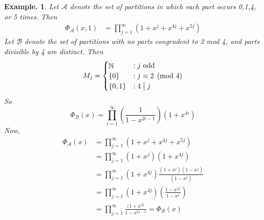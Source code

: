 \documentclass[11pt, a4paper]{memoir}
\DeclareMathOperator{\N}{{\mathbb{N}}}
\renewcommand{\div}{\bigm|}
\theoremstyle{change}
\theoremstyle{plain}
\theoremstyle{nonumberplain}
\newtheorem{example}{Example.}
\numberwithin{equation}{section}
\begin{document}
\begin{example}
    Let $\mathcal{A}$ denote the set of partitions in which each part occurs 0,1,4, or 5 times.
    Then
    \begin{align*}
        \Phi_{\mathcal{A}}(x,1) &= \prod_{j=1}^\infty(1+x^j+x^{4j}+x^{5j})
    \end{align*}
    Let $\mathcal{B}$ denote the set of partitions with no parts congrudent to 2 mod 4, and parts divisible by 4 are distinct.
    Then
    \begin{equation*}
        M_j = 
        \begin{cases}
            \N &:j\text{ odd}\\
            \{0\} &: j\equiv 2\pmod{4}\\
            \{0,1\} & : 4\div j
        \end{cases}
    \end{equation*}
    So
    \begin{equation*}
        \Phi_{\mathcal{B}}(x)=\prod_{i=1}^\infty\left(\frac{1}{1-x^{2i-1}}\right)(1+x^{4i})
    \end{equation*}
    Now,
    \begin{align*}
        \Phi_{\mathcal{A}}(x) &= \prod_{j=1}^\infty(1+x^j+x^{4j}+x^{5j})\\
                              &= \prod_{j=1}^\infty(1+x^j)(1+x^{4j})\\
                              &= \prod_{j=1}^\infty(1+x^{4j})\frac{(1+x^j)(1-x^j)}{(1-x^j)}\\
                              &= \prod_{j=1}^\infty(1+x^{4j})\left(\frac{1-x^{2j}}{1-x^j}\right)\\
                              &= \prod_{j=1}^\infty\frac{(1+x^{4j}}{1-x^{2j-1}}=\Phi_{\mathcal{B}}(x)
    \end{align*}
\end{example}
\end{document}

